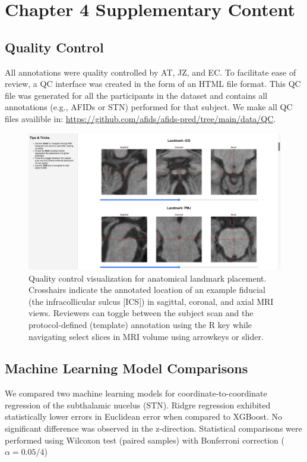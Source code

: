 \chapter{Chapter 4 Supplementary Content}\label{app:suppcontentch4}
\newpage

\section{Quality Control}\label{app:qualitycontrol}
All annotations were quality controlled by AT, JZ, and EC. To facilitate ease of review, a QC interface was created in the form of an HTML file format. This QC file was generated for all the participants in the dataset and contains all annotations (e.g., AFIDs or STN) performed for that subject. We make all QC files availible in: \url{https://github.com/afids/afids-pred/tree/main/data/QC}.

\begin{figure}[hbt!]
    \centering
    \includegraphics[width=0.95\linewidth]{figs/figuresupQC.png}
    \caption{Quality control visualization for anatomical landmark placement. Crosshairs indicate the annotated location of an example fiducial (the infracollicular sulcus [ICS]) in sagittal, coronal, and axial MRI views. Reviewers can toggle between the subject scan and the protocol-defined (template) annotation using the R key while navigating select slices in MRI volume using arrowkeys or slider.}
    \label{fig:figuresupQC}
\end{figure}

\newpage
\section{Machine Learning Model Comparisons}\label{app:qualitycontrol}
We compared two machine learning models for coordinate-to-coordinate regression of the subthalamic nucelus (STN). Ridgre regression exhibited statistically lower errors in Euclidean error when compared to XGBoost. No significant difference was observed in the z-direction. Statistical comparisons were performed using Wilcoxon test (paired samples) with Bonferroni correction (\(\alpha = 0.05/4\))



